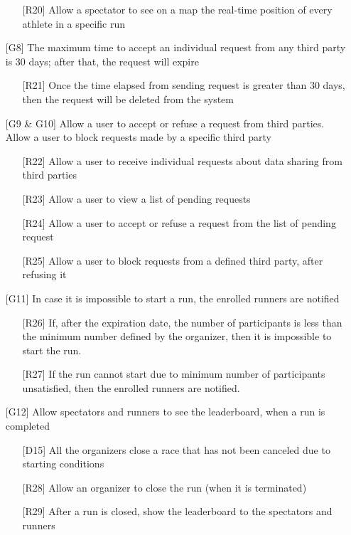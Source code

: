 \begin{itemize}
\begin{itemize}
	\item[{[R20]}] Allow a spectator to see on a map the real-time position of every athlete in a specific run
	\end{itemize}
\item[{[G8]}] The maximum time to accept an individual request from any third party is 30 days; after that, the request will expire
	\begin{itemize}
	\item[{[R21]}] Once the time elapsed from sending request is greater than 30 days, then the request will be deleted from the system
	\end{itemize}
\item[{[G9 \& G10]}] Allow a user to accept or refuse a request from third parties. Allow a user to block requests made by a specific third party
	\begin{itemize}
	\item[{[R22]}] Allow a user to receive individual requests about data sharing from third parties
	\item[{[R23]}] Allow a user to view a list of pending requests
	\item[{[R24]}] Allow a user to accept or refuse a request from the list of pending request
	\item[{[R25]}] Allow a user to block requests from a defined third party, after refusing it
	\end{itemize}	
\item[{[G11]}] In case it is impossible to start a run, the enrolled runners are notified
	\begin{itemize}
	\item[{[R26]}] If, after the expiration date, the number of participants is less than the minimum number defined by the organizer, then it is impossible to start the run.
	\item[{[R27]}] If the run cannot start due to minimum number of participants unsatisfied, then the enrolled runners are notified.
	\end{itemize}
\item[{[G12]}] Allow spectators and runners to see the leaderboard, when a run is completed
	\begin{itemize}
	\item[{[D15]}]All the organizers close a race that has not been canceled due to starting conditions
	\item[{[R28]}] Allow an organizer to close the run (when it is terminated)
	\item[{[R29]}] After a run is closed, show the leaderboard to the spectators and runners

\end{itemize}
\end{itemize}
